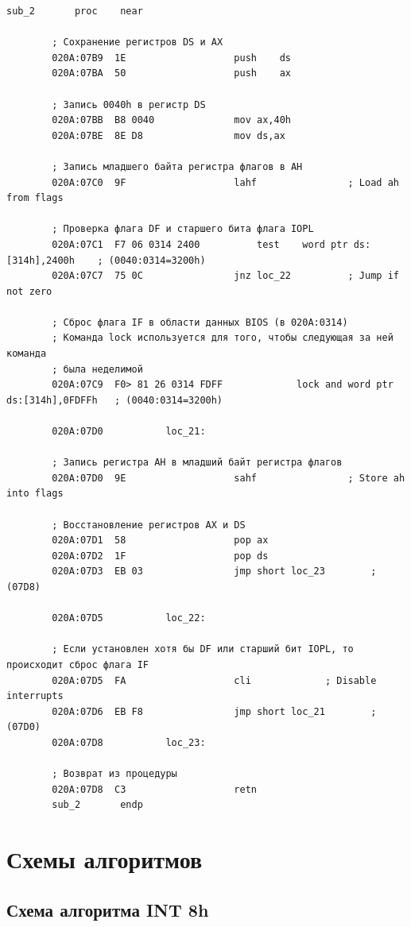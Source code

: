 \documentclass[14pt, a4paper]{article}
\begin{document}
	\begin{lstlisting}[style={asm}]
						sub_2		proc	near
		
		; Сохранение регистров DS и AX
		020A:07B9  1E					push	ds
		020A:07BA  50					push	ax
		
		; Запись 0040h в регистр DS
		020A:07BB  B8 0040				mov	ax,40h
		020A:07BE  8E D8				mov	ds,ax
		
		; Запись младшего байта регистра флагов в AH
		020A:07C0  9F					lahf				; Load ah from flags
		
		; Проверка флага DF и старшего бита флага IOPL
		020A:07C1  F7 06 0314 2400			test	word ptr ds:[314h],2400h	; (0040:0314=3200h)
		020A:07C7  75 0C				jnz	loc_22			; Jump if not zero
		
		; Сброс флага IF в области данных BIOS (в 020A:0314)
		; Команда lock используется для того, чтобы следующая за ней команда
		; была неделимой
		020A:07C9  F0> 81 26 0314 FDFF	           lock	and	word ptr ds:[314h],0FDFFh	; (0040:0314=3200h)
		
		020A:07D0			loc_21:
		
		; Запись регистра AH в младший байт регистра флагов
		020A:07D0  9E					sahf				; Store ah into flags
		
		; Восстановление регистров AX и DS
		020A:07D1  58					pop	ax
		020A:07D2  1F					pop	ds
		020A:07D3  EB 03				jmp	short loc_23		; (07D8)
		
		020A:07D5			loc_22:
		
		; Если установлен хотя бы DF или старший бит IOPL, то происходит сброс флага IF
		020A:07D5  FA					cli				; Disable interrupts
		020A:07D6  EB F8				jmp	short loc_21		; (07D0)
		020A:07D8			loc_23:
		
		; Возврат из процедуры
		020A:07D8  C3					retn
		sub_2		endp
	\end{lstlisting}
	
	\pagebreak
	
	\section*{Схемы алгоритмов}
	
	\subsection*{Схема алгоритма INT 8h}
	
\end{document}
